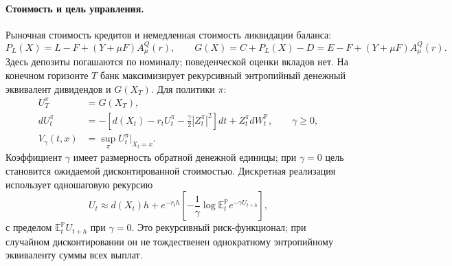 \documentclass[11pt,a4paper]{article}
\begin{document}
\paragraph{Стоимость и цель управления.}
Рыночная стоимость кредитов и немедленная стоимость ликвидации баланса:
\begin{equation}
 P_L(X)=L-F+(Y+\mu F)A_\mu^Q(r),\qquad
 G(X)=C+P_L(X)-D=E-F+(Y+\mu F)A_\mu^Q(r).
 \label{eq:mtm}
\end{equation}
Здесь депозиты погашаются по номиналу; поведенческой оценки вкладов нет.
На конечном горизонте $T$ банк максимизирует рекурсивный энтропийный
денежный эквивалент дивидендов и $G(X_T)$. Для политики $\pi$:
\begin{align}
 U_T^\pi&=G(X_T),\label{eq:terminal}\\
 dU_t^\pi&=-\left[d(X_t)-r_tU_t^\pi
             -\frac{\gamma}{2}|Z_t^\pi|^2\right]dt
             +Z_t^\pi dW_t^{\mathbb P},\qquad \gamma\geq0,\label{eq:bsde}\\
 V_\gamma(t,x)&=\sup_{\pi}U_t^\pi\big|_{X_t=x}.
 \label{eq:objective}
\end{align}
Коэффициент $\gamma$ имеет размерность обратной денежной единицы;
при $\gamma=0$ цель становится ожидаемой дисконтированной стоимостью.
Дискретная реализация использует одношаговую рекурсию
\begin{equation}
 U_t\approx d(X_t)h+e^{-r_th}
 \left[-\frac1\gamma\log\mathbb E_t^{\mathbb P}
           e^{-\gamma U_{t+h}}\right],
 \label{eq:bellman}
\end{equation}
с пределом $\mathbb E_t^{\mathbb P}U_{t+h}$ при $\gamma=0$.
Это рекурсивный риск-функционал; при случайном дисконтировании он не
тождественен однократному энтропийному эквиваленту суммы всех выплат.
\end{document}
